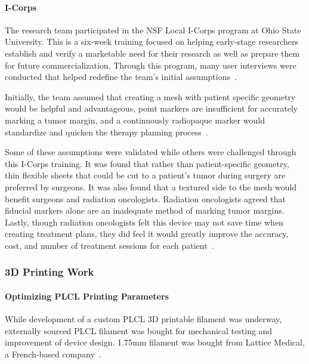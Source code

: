 \paragraph*{I-Corps\label{sec:introduction:priorWork:otherTeamWork:customerDiscovery:iCorps}}

The research team participated in the NSF Local I-Corps program at Ohio State University. This is a six-week training focused on helping early-stage researchers establish and verify a marketable need for their research as well as prepare them for future commercialization. Through this program, many user interviews were conducted that helped redefine the team's initial assumptions~\cite{RefWorks:RefID:386-bakhtarpostlumpectomy}.

Initially, the team assumed that creating a mesh with patient specific geometry would be helpful and advantageous, point markers are insufficient for accurately marking a tumor margin, and a continuously radiopaque marker would standardize and quicken the therapy planning process~\cite{RefWorks:RefID:386-bakhtarpostlumpectomy}.

Some of these assumptions were validated while others were challenged through this I-Corps training. It was found that rather than patient-specific geometry, thin flexible sheets that could be cut to a patient's tumor during surgery are preferred by surgeons. It was also found that a textured side to the mesh would benefit surgeons and radiation oncologists. Radiation oncologists agreed that fiducial markers alone are an inadequate method of marking tumor margins. Lastly, though radiation oncologists felt this device may not save time when creating treatment plans, they did feel it would greatly improve the accuracy, cost, and number of treatment sessions for each patient~\cite{RefWorks:RefID:386-bakhtarpostlumpectomy}.
\subsubsection{3D Printing Work\label{sec:introduction:priorWork:otherTeamWork:3dPrinting}}

\paragraph*{Optimizing PLCL Printing Parameters\label{sec:introduction:priorWork:otherTeamWork:3dPrinting:plclParameters}}

While development of a custom PLCL 3D printable filament was underway, externally sourced PLCL filament was bought for mechanical testing and improvement of device design. 1.75mm filament was bought from Lattice Medical, a French-based company~\cite{RefWorks:RefID:42-latticemedical}.

